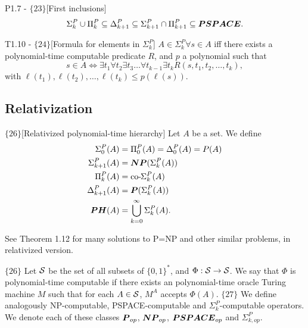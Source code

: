 \documentclass{article}
\begin{document}
\begin{flexilemma}{P1.7 - $\{23\}$}[First inclusions]
    \begin{equation}
        \Sigma_k^P \cup \Pi_k^P \subseteq \Delta_{k+1}^P \subseteq \Sigma_{k+1}^P \cap \Pi_{k+1}^P \subseteq \boldsymbol{PSPACE}.
    \end{equation}
\end{flexilemma}

\begin{flexitheorem}{T1.10 - $\{24\}$}[Formula for elements in $\Sigma_k^P$]
    $A \in \Sigma_k^P \forall s \in A$ iff there exists a polynomial-time computable predicate $R$, and $p$ a polynomial such that
    \begin{equation}
        s \in A \iff \exists t_1 \forall t_2 \exists t_3 \ldots \forall t_{k-1} \exists t_{k} R(s,t_1,t_2,\ldots,t_k),
    \end{equation}
    with $\ell(t_1),\ell(t_2),\ldots,\ell(t_k) \leq p(\ell(s))$.
\end{flexitheorem}

\subsection{Relativization}

\begin{flexidefinition}{$\{26\}$}[Relativized polynomial-time hierarchy]
    Let $A$ be a set. We define
    \begin{align}
        \Sigma_0^P(A) &= \Pi_0^P(A) = \Delta_0^P(A) = P(A)\\
        \Sigma_{k+1}^P(A) &= \boldsymbol{NP}(\Sigma_k^P(A))\\
        \Pi_{k}^P(A) &= {\bf \operatorname{co-}\hspace{-0.25mm}} \Sigma_{k}^P(A)\\
        \Delta_{k+1}^P(A) &= \boldsymbol{P}(\Sigma_k^P(A))\\
        \boldsymbol{PH}(A) &= \bigcup_{k=0}^\infty \Sigma_k^P(A).
    \end{align}
\end{flexidefinition}
See Theorem 1.12 for many solutions to P=NP and other similar problems, in relativized version.

$\{26\}$ Let $\mathcal{S}$ be the set of all subsets of $\{0,1\}^\ast$, and $\Phi : \mathcal{S} \to \mathcal{S}$. We say that $\Phi$ is polynomial-time computable if there exists an polynomial-time oracle Turing machine $M$ such that for each $A \in \mathcal{S}$, $M^A$ accepts $\Phi(A)$. $\{27\}$ We define analogously NP-computable, PSPACE-computable and $\Sigma_k^P$-computable operators. We denote each of these classes $\boldsymbol{P}_{op}$, $\boldsymbol{NP}_{op}$, $\boldsymbol{PSPACE}_{op}$ and $\Sigma_{k,op}^P$.
\end{document}
